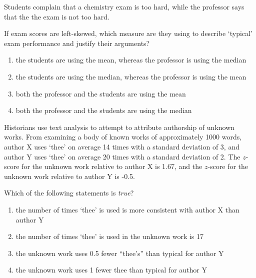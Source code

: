 \begin{frame}
Students complain that a chemistry exam is too hard, while the professor says that the the exam is not too hard.
\begin{clicker}{  If exam scores are left-skewed, which measure are they using to describe `typical' exam performance and justify their arguments?}
  \begin{enumerate}
        \item
        the students are using the mean, whereas the professor is using the median
        \item
        the students are using the median, whereas the professor is using the mean
        \item
        both the professor and the students are using the mean
        \item
        both the professor and the students are using the median
    \end{enumerate}
\end{clicker}
\end{frame}

\begin{frame}
Historians use text analysis to attempt to attribute authorship of unknown works.  From examining a body of known works of approximately 1000 words, author X uses `thee' on average 14 times with a standard deviation of 3, and author Y uses `thee' on average 20 times with a standard deviation of 2.  The $z$-score for the unknown work relative to author X is 1.67, and the $z$-score for the unknown work relative to author Y is -0.5.
\begin{clicker}{Which of the following statements is  \emph{true}?}
    \begin{enumerate}
        \item
        the number of times `thee' is used is more consistent with author X than author Y
        \item
        the number of times `thee' is used in the unknown work is 17
        \item
        the unknown work uses 0.5 fewer ``thee's'' than typical for author Y
        \item
        the unknown work uses 1 fewer thee than typical for author Y
    \end{enumerate}
\end{clicker}
\end{frame}

